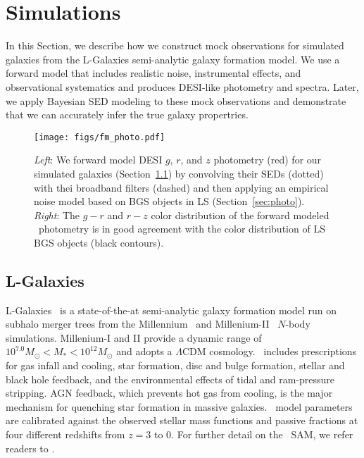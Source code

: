 \section{Simulations}\label{sec:sims}
In this Section, we describe how we construct mock observations for simulated
galaxies from the {\sc L-Galaxies} semi-analytic galaxy formation model.
We use a forward model that includes realistic noise, instrumental effects, and
observational systematics and produces DESI-like photometry and spectra. 
Later, we apply Bayesian SED modeling to these mock observations and
demonstrate that we can accurately infer the true galaxy propertries.

\begin{figure}
\begin{center}
\texttt{[image: figs/fm\_photo.pdf]}
\caption{{\em Left}: We forward model DESI $g$, $r$, and $z$ photometry (red)
    for our simulated galaxies (Section~\ref{sec:lgal}) by convolving their
    SEDs (dotted) with thei broadband filters (dashed) and then applying an 
    empirical noise model based on BGS objects in LS (Section~\ref{sec:photo}).
    {\em Right}: The $g-r$ and $r-z$ color distribution of the forward modeled
    \lgal~photometry is in good agreement with the color distribution of LS BGS
    objects (black contours).} \label{fig:photo}
\end{center}
\end{figure}

\subsection{L-Galaxies} \label{sec:lgal}
{\sc L-Galaxies}~\citep[hereafter \lgal;][]{henriques2015} is a state-of-the-at
semi-analytic galaxy formation model run on subhalo merger trees from the
Millennium~\citep{springel2005a} and Millenium-II~\citep{boylan-kolchin2009}
$N$-body simulations. 
Millenium-I and II provide a dynamic range of $10^{7.0} M_\odot < M_* < 10^{12}
M_\odot$ and adopts a \cite{planckcollaboration2014a} $\Lambda$CDM cosmology.
\lgal~includes prescriptions for gas infall and cooling, star formation, disc
and bulge formation, stellar and black hole feedback, and the environmental
effects of tidal and ram-pressure stripping.
AGN feedback, which prevents hot gas from cooling, is the major mechanism for
quenching star formation in massive galaxies.
\lgal~model parameters are calibrated against the observed stellar mass
functions and passive fractions at four different redshifts from $z = 3$ to
0.
For further detail on the \lgal~SAM, we refer readers to \cite{henriques2015}. 

